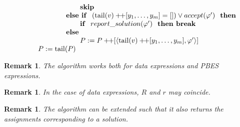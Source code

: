 \documentclass{article}
\newtheorem{remark}[theorem]{Remark}
\newcommand{\concat}{\ensuremath{+\!\!+}}
\begin{document}
\[\begin{tabular}{l}
\qquad \qquad \qquad \qquad \textbf{skip } \\
\qquad \qquad \qquad \textbf{else if } 
$(\mathrm{tail}(v) \concat [y_1,\ldots ,y_m] = []) \vee accept(\varphi')$
\textbf{ then} \\
\qquad \qquad \qquad \qquad \textbf{if } $report\_solution(\varphi')$ \textbf{ then break} \\
\qquad \qquad \qquad \textbf{else} \\
\qquad \qquad \qquad \qquad $P:=P\concat\lbrack \left\langle \mathrm{tail}(v) \concat [y_{1},\ldots ,y_{m}],\varphi'\right\rangle ]$ \\
\qquad $P:=\mathrm{tail}(P)$
\end{tabular}
\]

\begin{remark}
The algorithm works both for data expressions and PBES expressions.
\end{remark}

\begin{remark}
In the case of data expressions, $R$ and $r$ may coincide.%
\end{remark}

\begin{remark}
The algorithm can be extended such that it also returns the assignments
corresponding to a solution.
\end{remark}
\end{document}

